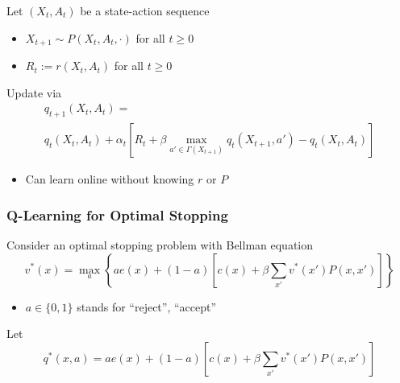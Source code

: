 \documentclass[xcolor=dvipsnames]{beamer}  %
\renewcommand{\geq}{\geqslant}
\newcommand{\1}{\mathbbm 1}
\begin{document}
\begin{frame}
    
    Let $(X_t, A_t)$ be a state-action sequence

    \begin{itemize}
        \item $X_{t+1} \sim P(X_t, A_t, \cdot)$ for all $t \geq 0$
        \vspace{0.5em}
        \item $R_t := r(X_t, A_t)$ for all $t \geq 0$
    \end{itemize}

    \vspace{0.5em}
    \vspace{0.5em}

    Update via
    \begin{multline*}
        q_{t+1}(X_t, A_t) =
        \\
        q_t(X_t, A_t) + \alpha_t 
        \left[
            R_t + \beta \max_{a' \in \Gamma(X_{t+1})} q_t(X_{t+1}, a')
            - q_t(X_t, A_t)
        \right]
    \end{multline*}

    \begin{itemize}
        \item Can learn online without knowing $r$ or $P$
    \end{itemize}

\end{frame}


\begin{frame}
    \frametitle{Q-Learning for Optimal Stopping}

    Consider an optimal stopping problem with Bellman equation
    \begin{equation*}
        v^*(x) = \max_a
        \left\{
            a e(x) + (1-a)
            \left[ 
                c(x) + \beta \sum_{x'} v^*(x')P(x,x')
            \right]
        \right\}
    \end{equation*}

    \begin{itemize}
        \item $a \in \{0, 1\}$ stands for ``reject'', ``accept''
    \end{itemize}

    Let
    \begin{equation*}
        q^*(x,a) =
            a e(x) + (1-a)
            \left[ 
                c(x) + \beta \sum_{x'} v^*(x')P(x,x')
            \right]
    \end{equation*}

\end{frame}
\end{document}
